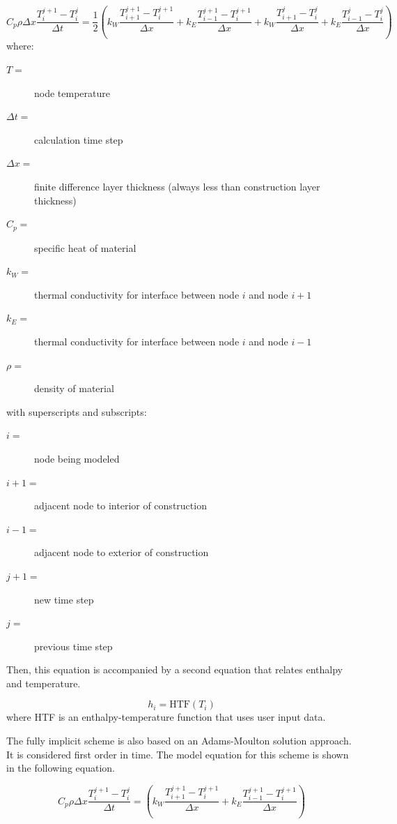 \begin{equation}
C_p \rho \Delta x \frac{T_i^{j+1}-T_i^j}{\Delta t} =
     \frac{1}{2}\left(k_W\frac{T_{i+1}^{j+1}-T_{i}^{j+1}}{\Delta x} +
                      k_E\frac{T_{i-1}^{j+1}-T_{i}^{j+1}}{\Delta x} +
                      k_W\frac{T_{i+1}^{j}-T_{i}^{j}}{\Delta x} +
                      k_E\frac{T_{i-1}^{j}-T_{i}^{j}}{\Delta x}\right)
\label{eq:InternalNodeImplicitEquation}
\end{equation}
%
where:
\begin{description}
\item[\(T =\)] node temperature
\item[\(\Delta t =\)] calculation time step
\item[\(\Delta x =\)] finite difference layer thickness (always less
than construction layer thickness)
\item[\(C_p =\)] specific heat of material
\item[\(k_W =\)] thermal conductivity for interface between node $i$ and node $i+1$
\item[\(k_E =\)] thermal conductivity for interface between node $i$ and node $i-1$
\item[\(\rho =\)] density of material
\end{description}
%
with superscripts and subscripts:
%
\begin{description}
\item[\(i =\)] node being modeled
\item[\(i+1 =\)] adjacent node to interior of construction
\item[\(i-1 =\)] adjacent node to exterior of construction
\item[\(j+1 =\)] new time step
\item[\(j =\)] previous time step
\end{description}
%
Then, this equation is accompanied by a second equation that relates enthalpy
and temperature.

\begin{equation}
h_i = \text{HTF}\left(T_i\right)
\end{equation}
%
where HTF is an enthalpy-temperature function that uses user input data.

The fully implicit scheme is also based on an Adams-Moulton solution approach.
It is considered first order in time. The model equation for this scheme is
shown in the following equation.

\begin{equation}
C_p\rho \Delta x \frac{T_i^{j + 1} - T_i^j}{\Delta t}
 = \left( k_W\frac{T_{i + 1}^{j + 1} - T_i^{j + 1}}{\Delta x}
 + k_E\frac{T_{i - 1}^{j + 1} - T_i^{j + 1}}{\Delta x} \right)
\end{equation}

